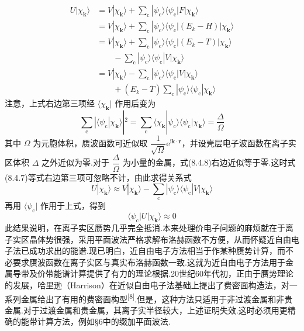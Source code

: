 \begin{equation}
\begin{aligned}
  U|\chi_{\boldsymbol{k}}\rangle
  &=V|\chi_{\boldsymbol{k}}\rangle+\sum_{\mathrm{c}}|\psi_{\mathrm{c}}\rangle\langle\psi_{\mathrm{c}}|F|\chi_{\boldsymbol{k}}\rangle\\
  &=V|\chi_{\boldsymbol{k}}\rangle+\sum_{\mathrm{c}}|\psi_{\mathrm{c}}\rangle\langle\psi_{\mathrm{c}}|(E_{k}-H)|\chi_{\boldsymbol{k}}\rangle\\
  &=V|\chi_{\boldsymbol{k}}\rangle+\sum_{\mathrm{c}}|\psi_{\mathrm{c}}\rangle\langle\psi_{\mathrm{c}}|(E_{k}-T)|\chi_{\boldsymbol{k}}\rangle\\
  &\qquad-\sum_{\mathrm{c}}|\psi_{\mathrm{c}}\rangle\langle\psi_{\mathrm{c}}|V|\chi_{\boldsymbol{k}}\rangle\\
  &=V|\chi_{\boldsymbol{k}}\rangle-\sum_{\mathrm{c}}|\psi_{\mathrm{c}}\rangle\langle\psi_{\mathrm{c}}|V|\chi_{\boldsymbol{k}}\rangle\\
  &\qquad+(E_{k}-\overline{T})\sum_{\mathrm{c}}|\psi_{\mathrm{c}}\rangle\langle\psi_{\mathrm{c}}|\chi_{\boldsymbol{k}}\rangle
\end{aligned}
\end{equation}
注意，上式右边第三项经 $\langle\chi_{\boldsymbol{k}}|$ 作用后变为
\begin{equation}
  \sum_{\mathrm{c}}|\langle\psi_{\mathrm{c}}|\chi_{\boldsymbol{k}}\rangle|^{2}
  =\sum_{\mathrm{c}}\langle\chi_{\boldsymbol{k}}|\psi_{\mathrm{c}}\rangle\langle\psi_{\mathrm{c}}|\chi_{\boldsymbol{k}}\rangle
  =\frac{\Delta}{\Omega}
\end{equation}
其中 $\Omega$ 为元胞体积，赝波函数可近似取 $\dfrac{1}{\sqrt{\Omega}}\mathrm{e}^{\mathrm{i}\boldsymbol{k}\cdot\boldsymbol{r}}$，并设壳层电子波函数在离子实区体积 $\Delta$ 之外近似为零.对于 $\dfrac{\Delta}{\Omega}$ 为小量的金属，式(8.4.8)右边近似等于零.这时式(8.4.7)等式右边第三项可忽略不计，由此求得关系式
\begin{equation}
  U|\chi_{\boldsymbol{k}}\rangle\approx V|\chi_{\boldsymbol{k}}\rangle
  -\sum_{\mathrm{c}}|\psi_{\mathrm{c}}\rangle\langle\psi_{\mathrm{c}}|V|\chi_{\boldsymbol{k}}\rangle
\end{equation}
再用 $\langle\psi_{\mathrm{c}}|$ 作用于上式，得到
\begin{equation}
  \langle\psi_{\mathrm{c}}|U|\chi_{\boldsymbol{k}}\rangle\approx 0
\end{equation}
此结果说明，在离子实区赝势几乎完全抵消.本来处理价电子问题的麻烦就在于离子实区晶体势很强，采用平面波法严格求解布洛赫函数不方便，从而怀疑近自由电子法已成功求出的能谱.现已明白，近自由电子方法相当于作某种赝势计算，而不必要求赝波函数在离子实区与真实布洛赫函数一致.这就为近自由电子方法用于金属导带及价带能谱计算提供了有力的理论根据.20世纪60年代初，正由于赝势理论的发展，哈里逊（Harrison）在近似自由电子法基础上提出了费密面构造法，对一系列金属给出了有用的费密面构型\textsuperscript{[8]}.但是，这种方法只适用于非过渡金属和非贵金属.对于过渡金属和贵金属，其离子实半径较大，上述证明失效.这时必须用更精确的能带计算方法，例如§6中的缀加平面波法.
